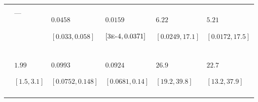 \begin{table}
\begin{tabular}{>{\raggedleft\arraybackslash}m{1.2cm}>{\raggedright\arraybackslash}m{2.3cm}>{\raggedright\arraybackslash}m{2.3cm}>{\raggedright\arraybackslash}m{2.3cm}ll}
\cellcolor{blue!5!white!90!black}{$V_{\text{F}}$} & \cellcolor{gray}{$0.00425$\par $[6.6\text{\textsc{e-4}},0.0106]$} & \cellcolor{gray}{---} & \cellcolor{gray}{---} & \cellcolor{gray}{---} & \cellcolor{gray}{---}\\
\cellcolor{blue!5!white!90!black}{$V_{\text{PE}}$} & --- & $0.0458$\par $[0.033,0.058]$ & $0.0159$\par $[3\text{\textsc{e-4}},0.0371]$ & $6.22$\par $[0.0249,17.1]$ & $5.21$\par $[0.0172,17.5]$\\
\cellcolor{blue!5!white!90!black}{$V_{\text{R}}$} & \cellcolor{gray}{$0.435$\par $[0.388,0.483]$} & \cellcolor{gray}{---} & \cellcolor{gray}{---} & \cellcolor{gray}{---} & \cellcolor{gray}{---}\\
\cellcolor{blue!5!white!90!black}{$V_{\text{P}}$} & $1.99$\par $[1.5,3.1]$ & $0.0993$\par $[0.0752,0.148]$ & $0.0924$\par $[0.0681,0.14]$ & $26.9$\par $[19.2,39.8]$ & $22.7$\par $[13.2,37.9]$\\
\cellcolor{blue!5!white!90!black}{$h^{2}$} & \cellcolor{gray}{$0.112$\par $[0.0654,0.171]$} & \cellcolor{gray}{$0.0224$\par $[5.3\text{\textsc{e-5}},0.154]$} & \cellcolor{gray}{$0.276$\par $[0.0511,0.533]$} & \cellcolor{gray}{$0.3$\par $[0.00215,0.662]$} & \cellcolor{gray}{$0.161$\par $[4.03\text{\textsc{e-4}},0.588]$}\\
\bottomrule
\end{tabular}
\end{table}